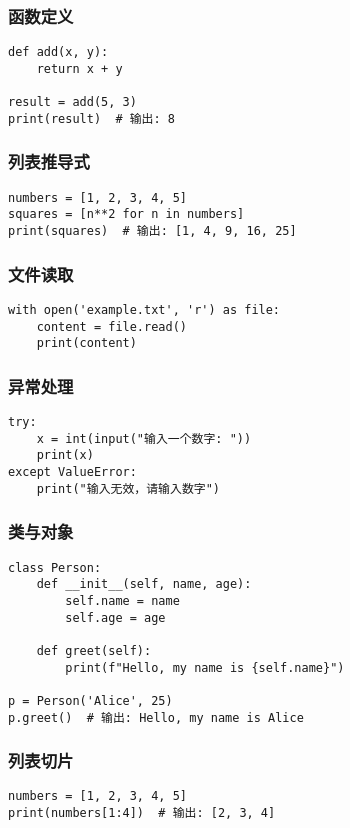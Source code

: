 \documentclass[a4paper, 12pt]{article}
\begin{document}
\subsubsection{函数定义}
\begin{lstlisting}
def add(x, y):
    return x + y

result = add(5, 3)
print(result)  # 输出: 8
\end{lstlisting}

\subsubsection{列表推导式}
\begin{lstlisting}
numbers = [1, 2, 3, 4, 5]
squares = [n**2 for n in numbers]
print(squares)  # 输出: [1, 4, 9, 16, 25]
\end{lstlisting}

\subsubsection{文件读取}
\begin{lstlisting}
with open('example.txt', 'r') as file:
    content = file.read()
    print(content)
\end{lstlisting}

\subsubsection{异常处理}
\begin{lstlisting}
try:
    x = int(input("输入一个数字: "))
    print(x)
except ValueError:
    print("输入无效，请输入数字")
\end{lstlisting}

\subsubsection{类与对象}
\begin{lstlisting}
class Person:
    def __init__(self, name, age):
        self.name = name
        self.age = age

    def greet(self):
        print(f"Hello, my name is {self.name}")

p = Person('Alice', 25)
p.greet()  # 输出: Hello, my name is Alice
\end{lstlisting}

\subsubsection{列表切片}
\begin{lstlisting}
numbers = [1, 2, 3, 4, 5]
print(numbers[1:4])  # 输出: [2, 3, 4]
\end{lstlisting}
\end{document}
